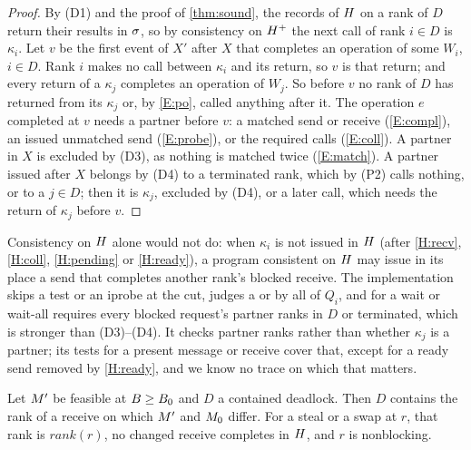 \begin{proof}
By (D1) and the proof of \cref{thm:sound}, the records of $H$ on a rank of $D$ return their
results in $\sigma$, so by consistency on $H^+$ the next call of rank $i\in D$ is $\kappa_i$.
Let $v$ be the first event of $X'$ after $X$ that completes an operation of some $W_i$,
$i\in D$. Rank $i$ makes no call between $\kappa_i$ and its return, so $v$ is that return; and
every return of a $\kappa_j$ completes an operation of $W_j$. So before $v$ no rank of $D$ has
returned from its $\kappa_j$ or, by \ref{E:po}, called anything after it. The operation $e$
completed at $v$ needs a partner before $v$: a matched send or receive (\ref{E:compl}), an
issued unmatched send (\ref{E:probe}), or the required calls (\ref{E:coll}). A partner in $X$ is
excluded by (D3), as nothing is matched twice (\ref{E:match}). A partner issued after $X$
belongs by (D4) to a terminated rank, which by (P2) calls nothing, or to a $j\in D$; then it is
$\kappa_j$, excluded by (D4), or a later call, which needs the return of $\kappa_j$ before $v$.
\end{proof}

Consistency on $H$ alone would not do: when $\kappa_i$ is not issued in $H$ (after
\ref{H:recv}, \ref{H:coll}, \ref{H:pending} or \ref{H:ready}), a program consistent on $H$
may issue in its place a send that completes another rank's blocked receive.
The implementation skips a test or an iprobe at the cut, judges a  or
 by all of $Q_i$, and for a wait or wait-all requires every blocked request's
partner ranks in $D$ or terminated, which is stronger than (D3)--(D4). It checks partner ranks
rather than whether $\kappa_j$ is a partner; its tests for a present message or receive cover
that, except for a ready send removed by \ref{H:ready}, and we know no trace on which that
matters.

\begin{proposition}\label{prop:app-deadrank}
Let $M'$ be feasible at $B\ge B_0$ and $D$ a contained deadlock. Then $D$ contains the
rank of a receive on which $M'$ and $M_0$ differ. For a steal or a swap at $r$, that rank is
$\mathit{rank}(r)$, no changed receive completes in $H$, and $r$ is nonblocking.
\end{proposition}

